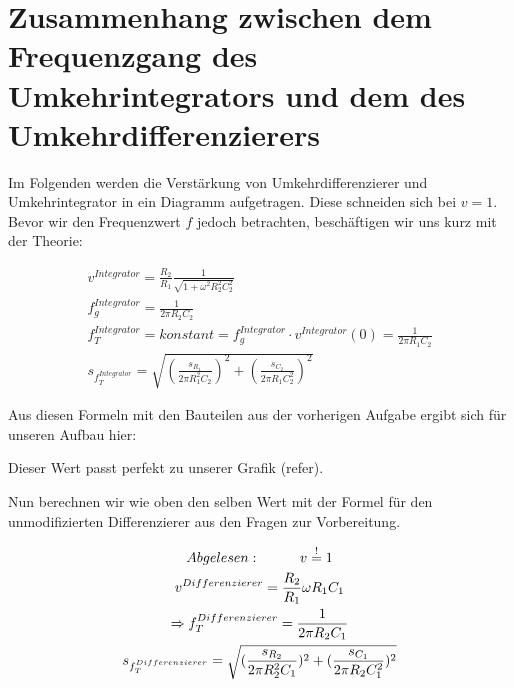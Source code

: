 \section*{Zusammenhang zwischen dem Frequenzgang des Umkehrintegrators und dem des Umkehrdifferenzierers}
Im Folgenden werden die Verstärkung von Umkehrdifferenzierer und Umkehrintegrator in ein Diagramm aufgetragen. 
Diese schneiden sich bei $v = 1$.\\
Bevor wir den Frequenzwert $f$ jedoch betrachten, beschäftigen wir uns kurz mit der Theorie:\newline

\begin{gather*}
    v^{Integrator} = \frac{R_2}{R_1}\frac{1}{\sqrt{1+\omega ^2 R_{2}^2C_{2}^2}}\\
    f_{g}^{Integrator} = \frac{1}{2 \pi R_2 C_2}\\
    f_{T}^{Integrator} = konstant = f_{g}^{Integrator} \cdot v^{Integrator}(0) = \frac{1}{2\pi R_1 C_2 }\\
    s_{f_{T}^{Integrator}} = \sqrt{(\frac{s_{R_1}}{2 \pi R_{1}^2 C_2})^2+ (\frac{s_{C_2}}{2 \pi R_{1} C_{2}^2})^2}
\end{gather*}

Aus diesen Formeln mit den Bauteilen aus der vorherigen Aufgabe ergibt sich für unseren Aufbau hier:


\begin{center}
\end{center}




Dieser Wert passt perfekt zu unserer Grafik (refer). %
\newpage
\begin{figure}
    \centering
\end{figure}


Nun berechnen wir wie oben den selben Wert mit der Formel für den unmodifizierten Differenzierer aus den 
Fragen zur Vorbereitung.

\begin{gather}
    Abgelesen:\tab v  \overset{!}{=} 1\\
    v^{Differenzierer} = \frac{R_2}{R_1} \omega R_1 C_1\\
    \Rightarrow f_{T}^{Differenzierer} = \frac{1}{2 \pi R_2 C_1}\\
    s_{f_{T}^{Differenzierer}} = \sqrt{(\frac{s_{R_2}}{2 \pi R_{2}^2 C_1})^2+ (\frac{s_{C_1}}{2 \pi R_{2} C_{1}^2})^2}
\end{gather}

